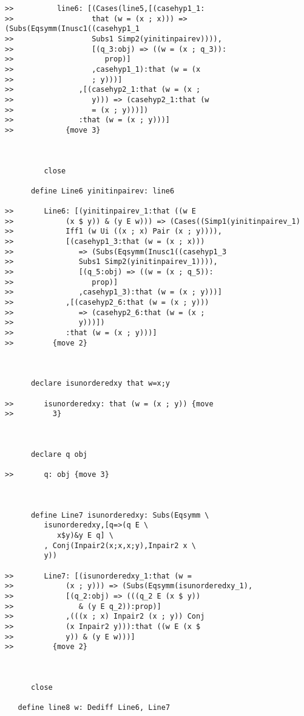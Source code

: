 \documentclass[12pt]{article}
\begin{document}
\begin{verbatim}
>>          line6: [(Cases(line5,[(casehyp1_1:
>>                  that (w = (x ; x))) => (Subs(Eqsymm(Inusc1((casehyp1_1
>>                  Subs1 Simp2(yinitinpairev)))),
>>                  [(q_3:obj) => ((w = (x ; q_3)):
>>                     prop)]
>>                  ,casehyp1_1):that (w = (x
>>                  ; y)))]
>>               ,[(casehyp2_1:that (w = (x ;
>>                  y))) => (casehyp2_1:that (w
>>                  = (x ; y)))])
>>               :that (w = (x ; y)))]
>>            {move 3}



         close

      define Line6 yinitinpairev: line6

>>       Line6: [(yinitinpairev_1:that ((w E
>>            (x $ y)) & (y E w))) => (Cases((Simp1(yinitinpairev_1)
>>            Iff1 (w Ui ((x ; x) Pair (x ; y)))),
>>            [(casehyp1_3:that (w = (x ; x)))
>>               => (Subs(Eqsymm(Inusc1((casehyp1_3
>>               Subs1 Simp2(yinitinpairev_1)))),
>>               [(q_5:obj) => ((w = (x ; q_5)):
>>                  prop)]
>>               ,casehyp1_3):that (w = (x ; y)))]
>>            ,[(casehyp2_6:that (w = (x ; y)))
>>               => (casehyp2_6:that (w = (x ;
>>               y)))])
>>            :that (w = (x ; y)))]
>>         {move 2}



      declare isunorderedxy that w=x;y

>>       isunorderedxy: that (w = (x ; y)) {move
>>         3}



      declare q obj

>>       q: obj {move 3}



      define Line7 isunorderedxy: Subs(Eqsymm \
         isunorderedxy,[q=>(q E \
            x$y)&y E q] \
         , Conj(Inpair2(x;x,x;y),Inpair2 x \
         y))

>>       Line7: [(isunorderedxy_1:that (w =
>>            (x ; y))) => (Subs(Eqsymm(isunorderedxy_1),
>>            [(q_2:obj) => (((q_2 E (x $ y))
>>               & (y E q_2)):prop)]
>>            ,(((x ; x) Inpair2 (x ; y)) Conj
>>            (x Inpair2 y))):that ((w E (x $
>>            y)) & (y E w)))]
>>         {move 2}



      close

   define line8 w: Dediff Line6, Line7


\end{verbatim}
\end{document}
